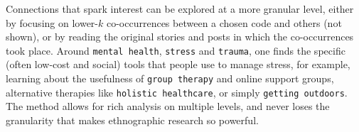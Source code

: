 \documentclass{llncs}
\begin{document}


Connections that spark interest can be explored at a more granular level, either by focusing on lower-$k$ co-occurrences between a chosen code and others (not shown), or by reading the original stories and posts in which the co-occurrences took place. Around  \texttt{mental health}, \texttt{stress} and \texttt{trauma},  one finds the specific (often low-cost and social) tools that people use to manage stress, for example, learning about the usefulness of \texttt{group therapy} and online support groups, alternative therapies like \texttt{holistic healthcare}, or simply \texttt{getting outdoors}. The method allows for rich analysis on multiple levels, and never loses the granularity that makes ethnographic research so powerful. 
\end{document}

